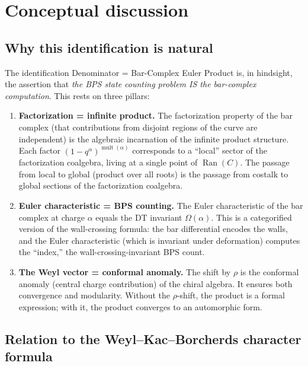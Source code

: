 \documentclass[11pt]{article}
\theoremstyle{definition}
\theoremstyle{remark}
\DeclareMathOperator{\Ran}{Ran}
\DeclareMathOperator{\mult}{mult}
\begin{document}
\section{Conceptual discussion}
\label{sec:discussion}

\subsection{Why this identification is natural}

The identification Denominator = Bar-Complex Euler Product is, in
hindsight, the assertion that \emph{the BPS state counting problem IS
the bar-complex computation}. This rests on three pillars:

\begin{enumerate}[label=(\arabic*)]
\item \textbf{Factorization = infinite product.} The factorization
property of the bar complex (that contributions from disjoint
regions of the curve are independent) is the algebraic incarnation
of the infinite product structure. Each factor
$(1 - q^\alpha)^{\mult(\alpha)}$ corresponds to a ``local'' sector of
the factorization coalgebra, living at a single point of $\Ran(C)$.
The passage from local to global (product over all roots) is the
passage from costalk to global sections of the factorization coalgebra.

\item \textbf{Euler characteristic = BPS counting.} The Euler
characteristic of the bar complex at charge $\alpha$ equals the DT
invariant $\Omega(\alpha)$. This is a categorified version of the
wall-crossing formula: the bar differential encodes the walls, and
the Euler characteristic (which is invariant under deformation)
computes the ``index,'' the wall-crossing-invariant BPS count.

\item \textbf{The Weyl vector = conformal anomaly.} The shift by
$\rho$ is the conformal anomaly (central charge contribution) of the
chiral algebra. It ensures both convergence and modularity. Without
the $\rho$-shift, the product is a formal expression; with it, the
product converges to an automorphic form.
\end{enumerate}

\subsection{Relation to the Weyl--Kac--Borcherds character formula}
\end{document}
